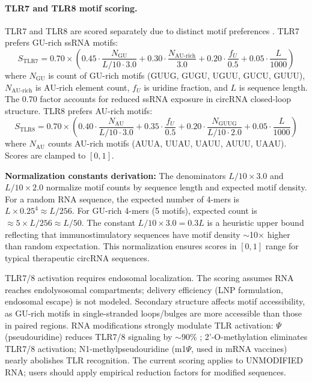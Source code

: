 \paragraph{TLR7 and TLR8 motif scoring.}
TLR7 and TLR8 are scored separately due to distinct motif preferences \citep{diebold2006,gorden2008}. TLR7 prefers GU-rich ssRNA motifs:
\begin{equation}
S_{\text{TLR7}} = 0.70 \times \left( 0.45 \cdot \frac{N_{\text{GU}}}{L/10 \cdot 3.0} + 0.30 \cdot \frac{N_{\text{AU-rich}}}{3.0} + 0.20 \cdot \frac{f_U}{0.5} + 0.05 \cdot \frac{L}{1000} \right)
\end{equation}
where $N_{\text{GU}}$ is count of GU-rich motifs (GUUG, GUGU, UGUU, GUCU, GUUU), $N_{\text{AU-rich}}$ is AU-rich element count, $f_U$ is uridine fraction, and $L$ is sequence length. The 0.70 factor accounts for reduced ssRNA exposure in circRNA closed-loop structure. TLR8 prefers AU-rich motifs:
\begin{equation}
S_{\text{TLR8}} = 0.70 \times \left( 0.40 \cdot \frac{N_{\text{AU}}}{L/10 \cdot 3.0} + 0.35 \cdot \frac{f_U}{0.5} + 0.20 \cdot \frac{N_{\text{GUUG}}}{L/10 \cdot 2.0} + 0.05 \cdot \frac{L}{1000} \right)
\end{equation}
where $N_{\text{AU}}$ counts AU-rich motifs (AUUA, UUAU, UAUU, AUUU, UAAU). Scores are clamped to $[0,1]$.

\textbf{Normalization constants derivation:} The denominators $L/10 \times 3.0$ and $L/10 \times 2.0$ normalize motif counts by sequence length and expected motif density. For a random RNA sequence, the expected number of 4-mers is $L \times 0.25^4 \approx L/256$. For GU-rich 4-mers (5 motifs), expected count is $\approx 5 \times L/256 \approx L/50$. The constant $L/10 \times 3.0 = 0.3L$ is a heuristic upper bound reflecting that immunostimulatory sequences have motif density $\sim$10$\times$ higher than random expectation. This normalization ensures scores in $[0,1]$ range for typical therapeutic circRNA sequences.

TLR7/8 activation requires endosomal localization. The scoring assumes RNA reaches endolysosomal compartments; delivery efficiency (LNP formulation, endosomal escape) is not modeled. Secondary structure affects motif accessibility, as GU-rich motifs in single-stranded loops/bulges are more accessible than those in paired regions. RNA modifications strongly modulate TLR activation: $\Psi$ (pseudouridine) reduces TLR7/8 signaling by $\sim$90\% \citep{anderson2019}; 2'-O-methylation eliminates TLR7/8 activation; N1-methylpseudouridine (m1$\Psi$, used in mRNA vaccines) nearly abolishes TLR recognition. The current scoring applies to UNMODIFIED RNA; users should apply empirical reduction factors for modified sequences.

